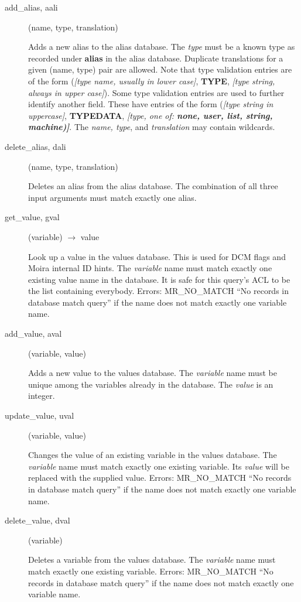 \begin{description}
\item[add\_alias, aali](name, type, translation)

Adds a new alias to the alias database.  The {\em type} must be a known
type as recorded under {\bf alias} in the alias database.  Duplicate
translations for a given (name, type) pair are allowed.  Note that
type validation entries are of the form ({\em [type name, usually in
lower case]}, {\bf TYPE}, {\em [type string, always in upper case]}).
Some type validation entries are used to further identify another
field.  These have entries of the form ({\em [type string in
uppercase]}, {\bf TYPEDATA}, {\em [type, one of: {\bf none, user, list,
string, machine)]}}.  The {\em name, type}, and {\em translation} may
contain wildcards.

\item[delete\_alias, dali](name, type, translation)

Deletes an alias from the alias database.  The combination of all
three input arguments must match exactly one alias.

\item[get\_value, gval](variable) $\rightarrow$ value

Look up a value in the values database.  This is used for DCM flags
and Moira internal ID hints.  The {\em variable} name must match exactly
one existing value name in the database.  It is safe for this query's
ACL to be the list containing everybody.  Errors: MR\_NO\_MATCH ``No
records in database match query'' if the name does not match exactly
one variable name.

\item[add\_value, aval](variable, value)

Adds a new value to the values database.  The {\em variable} name must
be unique among the variables already in the database.  The {\em value}
is an integer.

\item[update\_value, uval](variable, value)

Changes the value of an existing variable in the values database.  The
{\em variable} name must match exactly one existing variable.  Its
{\em value} will be replaced with the supplied value.  Errors:
MR\_NO\_MATCH ``No records in database match query'' if the name does not
match exactly one variable name.

\item[delete\_value, dval](variable)

Deletes a variable from the values database.  The {\em variable} name
must match exactly one existing variable.  Errors: MR\_NO\_MATCH ``No
records in database match query'' if the name does not match exactly
one variable name.


\end{description}
